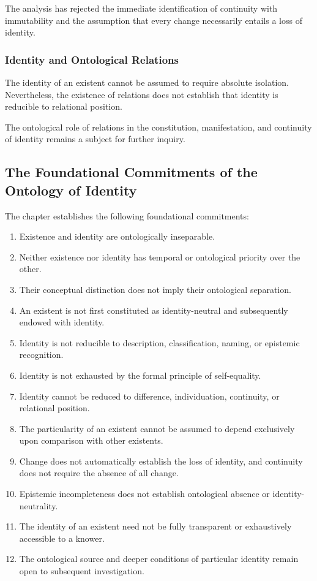 The analysis has rejected the immediate identification of continuity with immutability and the assumption that every change necessarily entails a loss of identity.

\subsubsection{Identity and Ontological Relations}

The identity of an existent cannot be assumed to require absolute isolation. Nevertheless, the existence of relations does not establish that identity is reducible to relational position.

The ontological role of relations in the constitution, manifestation, and continuity of identity remains a subject for further inquiry.

\subsection{The Foundational Commitments of the Ontology of Identity}

The chapter establishes the following foundational commitments:

\begin{enumerate}
    \item Existence and identity are ontologically inseparable.
    \item Neither existence nor identity has temporal or ontological priority over the other.
    \item Their conceptual distinction does not imply their ontological separation.
    \item An existent is not first constituted as identity-neutral and subsequently endowed with identity.
    \item Identity is not reducible to description, classification, naming, or epistemic recognition.
    \item Identity is not exhausted by the formal principle of self-equality.
    \item Identity cannot be reduced to difference, individuation, continuity, or relational position.
    \item The particularity of an existent cannot be assumed to depend exclusively upon comparison with other existents.
    \item Change does not automatically establish the loss of identity, and continuity does not require the absence of all change.
    \item Epistemic incompleteness does not establish ontological absence or identity-neutrality.
    \item The identity of an existent need not be fully transparent or exhaustively accessible to a knower.
    \item The ontological source and deeper conditions of particular identity remain open to subsequent investigation.
\end{enumerate}

